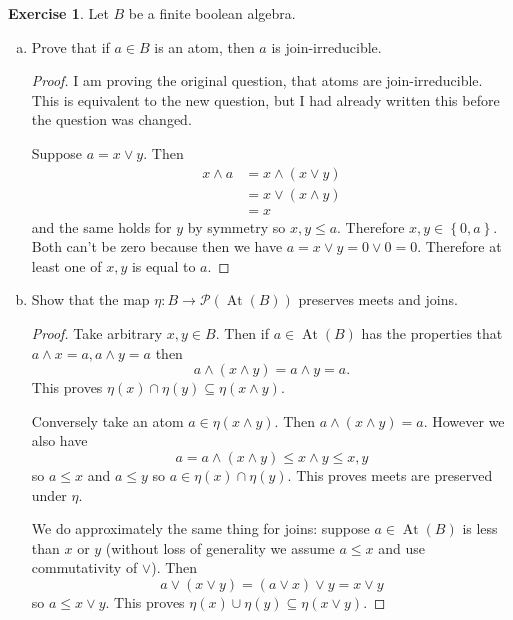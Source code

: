 \documentclass{article}
\newcommand{\powset}{\mathcal{P}}
\DeclareMathOperator{\atoms}{At}
\newcommand{\set}[1]{\left\{#1\right\}}
\theoremstyle{definition}
\newtheorem{question}{Exercise}
\begin{document}
\begin{question}
    Let \(B\) be a finite boolean algebra.

    \begin{enumerate}[a)]
        \item Prove that if \(a\in B\) is an atom, then \(a\) is
              join-irreducible.

              \begin{proof}
                  I am proving the original question, that atoms are
                  join-irreducible. This is equivalent to the new question, but
                  I had already written this before the question was changed.

                  Suppose \(a=x\vee y\). Then
                  \begin{align*}
                      x\wedge a & =x\wedge(x\vee y)  \\
                                & =x\vee (x\wedge y) \\
                                & =x
                  \end{align*}
                  and the same holds for \(y\) by symmetry so \(x,y\leq a\).
                  Therefore \(x,y\in\set{0,a}\). Both can't be zero because then
                  we have \(a=x\vee y=0\vee 0=0\). Therefore at least one of
                  \(x,y\) is equal to \(a\).
              \end{proof}

        \item Show that the map \(\eta:B\to\powset(\atoms(B))\) preserves meets
              and joins.

              \begin{proof}
                  Take arbitrary \(x,y\in B\). Then if \(a\in\atoms(B)\) has the
                  properties that \(a\wedge x=a,a\wedge y=a\) then
                  \[
                      a\wedge(x\wedge y)=a\wedge y=a.
                  \]
                  This proves \(\eta(x)\cap\eta(y)\subseteq\eta(x\wedge y)\).

                  Conversely take an atom \(a\in\eta(x\wedge y)\). Then
                  \(a\wedge(x\wedge y)=a\). However we also have
                  \[
                      a=a\wedge(x\wedge y)\leq x\wedge y\leq x,y
                  \]
                  so \(a\leq x\) and \(a\leq y\) so \(a\in\eta(x)\cap\eta(y)\).
                  This proves meets are preserved under \(\eta\).

                  We do approximately the same thing for joins: suppose
                  \(a\in\atoms(B)\) is less than \(x\) or \(y\) (without loss of
                  generality we assume \(a\leq x\) and use commutativity of
                  \(\vee\)). Then
                  \[
                      a\vee(x\vee y)=(a\vee x)\vee y=x\vee y
                  \]
                  so \(a\leq x\vee y\). This proves
                  \(\eta(x)\cup\eta(y)\subseteq\eta(x\vee y)\).


\end{proof}
\end{enumerate}
\end{question}
\end{document}
